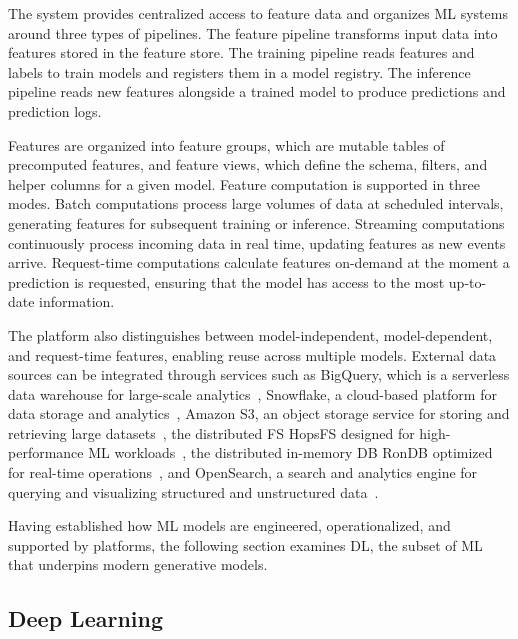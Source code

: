 \documentclass[
english,                 %
bibtex,                  %
]{kththesis}
\numberwithin{listing}{chapter}
\begin{document}
The system provides centralized access to feature data and organizes \gls{ML} systems around three types of pipelines. The feature pipeline transforms input data into features stored in the feature store. The training pipeline reads features and labels to train models and registers them in a model registry. The inference pipeline reads new features alongside a trained model to produce predictions and prediction logs.

Features are organized into feature groups, which are mutable tables of precomputed features, and feature views, which define the schema, filters, and helper columns for a given model. Feature computation is supported in three modes. Batch computations process large volumes of data at scheduled intervals, generating features for subsequent training or inference. Streaming computations continuously process incoming data in real time, updating features as new events arrive. Request-time computations calculate features on-demand at the moment a prediction is requested, ensuring that the model has access to the most up-to-date information.

The platform also distinguishes between model-independent, model-dependent, and request-time features, enabling reuse across multiple models. External data sources can be integrated through services such as BigQuery, which is a serverless data warehouse for large-scale analytics~\cite{fernandes_what_2015}, Snowflake, a cloud-based platform for data storage and analytics~\cite{snowflake_inc_snowflake_2026}, \Gls{Amazon S3}, an object storage service for storing and retrieving large datasets~\cite{amazon_web_services_inc_or_its_affiliates_s3_2026}, the distributed \gls{FS} \gls{HopsFS} designed for high-performance \gls{ML} workloads~\cite{niazi_hopsfs_2017}, the distributed in-memory \gls{DB} Ron\gls{DB} optimized for real-time operations~\cite{hopsworks_ab_rondb_2026}, and OpenSearch, a search and analytics engine for querying and visualizing structured and unstructured data~\cite{lf_projects_llc_opensearch_2026}.

Having established how \gls{ML} models are engineered, operationalized, and supported by platforms, the following section examines \gls{DL}, the subset of \gls{ML} that underpins modern generative models.

\subsection{Deep Learning}
\glsresetall
\label{sec:bg_dl}
\end{document}
